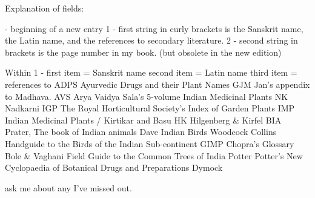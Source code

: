 Explanation of fields:

\indexentry - 	beginning of a new entry
{1} -			first string in curly brackets is the Sanskrit name, the Latin name, and the references to secondary literature.
{2} - 			second string in brackets is the page number in my book.  (but obsolete in the new edition)

Within {1} - 	first item = Sanskrit name
				second item = Latin name
				third item = references to 
					ADPS 	Ayurvedic Drugs and their Plant Names
					GJM		Jan's appendix to Madhava.
					AVS		Arya Vaidya Sala's 5-volume Indian Medicinal Plants
					NK 		Nadkarni
					IGP 	The Royal Horticultural Society's Index of Garden Plants
					IMP		Indian Medicinal Plants / Kirtikar and Basu
					HK		Hilgenberg & Kirfel
					BIA		Prater, The book of Indian animals
					Dave 	Indian Birds
					Woodcock Collins Handguide to the Birds of the Indian Sub-continent	
					GIMP	Chopra's Glossary
					Bole & Vaghani	Field Guide to the Common Trees of India
					Potter	Potter's New Cyclopaedia of Botanical Drugs and Preparations
					Dymock

					ask me about any I've missed out.
 

